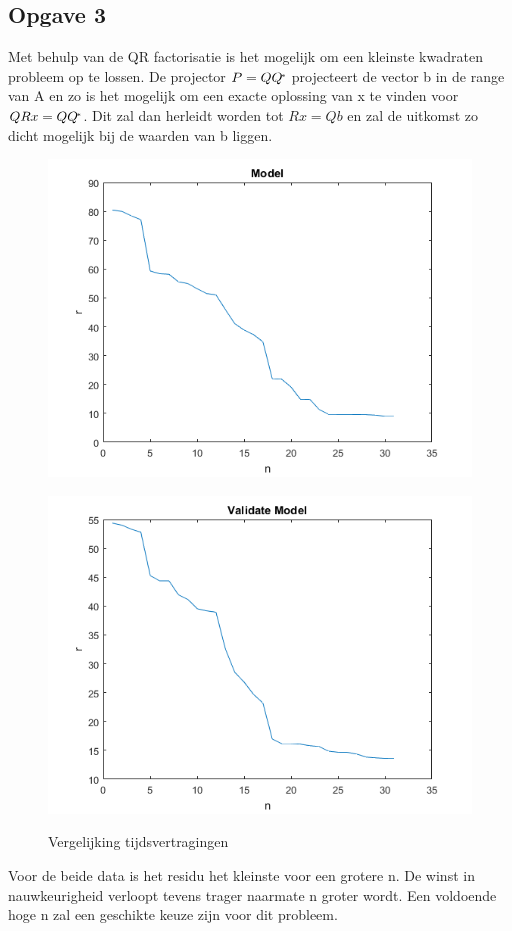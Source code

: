 \documentclass{Numerieke}
\newcommand\inv[1]{#1\raisebox{0.8ex}{$\scriptscriptstyle\!*$}}
\begin{document}
\subsection{Opgave 3}
Met behulp van de QR factorisatie is het mogelijk om een kleinste kwadraten probleem op te lossen. De projector \(P=Q\inv{Q}\) projecteert de vector b in de range van A en zo is het mogelijk om een exacte oplossing van x te vinden voor \(QRx=Q\inv{Q}\). Dit zal dan herleidt worden tot \(Rx=Qb\) en zal de uitkomst zo dicht mogelijk bij de waarden van b liggen. 
\begin{figure}[H]
	\centering
	\caption{Vergelijking tijdsvertragingen}
	\begin{minipage}[l]{.3\textwidth}
		\centering
		\includegraphics[width=1.05\linewidth]{Model_opgave3}
		\label{fig:test1}
	\end{minipage}%
	\begin{minipage}[r]{.3\textwidth}
		\centering
		\includegraphics[width=1.05\linewidth]{Validate_model_opgave3}
		\label{fig:test2}
	\end{minipage}
\end{figure}
Voor de beide data is het residu het kleinste voor een grotere n. De winst in nauwkeurigheid verloopt tevens trager naarmate n groter wordt. Een voldoende hoge n zal een geschikte keuze zijn voor dit probleem.
\newpage
\end{document}
